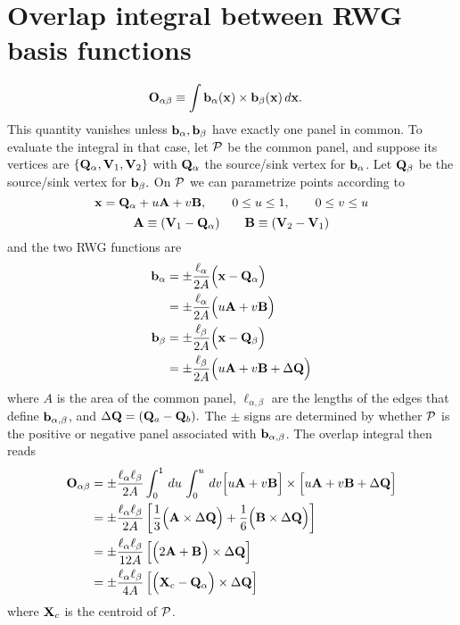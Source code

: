 \newpage
\section{Overlap integral between RWG basis functions}
\label{OverlapIntegralAppendix}

\begin{align*}
\mathbf{O}_{\alpha\beta}
&\equiv
 \int \mathbf{b}_\alpha(\mathbf{x}) \times \mathbf{b}_\beta(\mathbf{x}) \, d\mathbf{x} .
\end{align*}
This quantity vanishes unless $\mathbf{b}_\alpha,\mathbf{b}_\beta$
have exactly one panel in common. To evaluate the integral in
that case, let $\mathcal{P}$ be the common panel, and suppose its vertices
are $\{\mathbf{Q}_\alpha, \mathbf{V}_1, \mathbf{V}_2\}$ with $\mathbf{Q}_\alpha$ the  
source/sink vertex for $\mathbf{b}_\alpha$. Let $\mathbf{Q}_\beta$ be the
source/sink vertex for $\mathbf{b}_\beta.$
On $\mathcal{P}$ we can parametrize points according to 
$$ \mathbf{x} = \mathbf{Q}_\alpha + u\mathbf{A} + v \mathbf{B}, \qquad 0 \le u \le 1, \qquad 0 \le v \le u$$
$$ \mathbf{A} \equiv (\mathbf{V}_1 - \mathbf{Q}_\alpha)
   \qquad 
   \mathbf{B} \equiv (\mathbf{V}_2 - \mathbf{V}_1)
$$
and the two RWG functions are 
\begin{align*}
 \mathbf{b}_\alpha 
 &= \pm \frac{\ell_\alpha}{2A}\Big(\mathbf{x} - \mathbf{Q}_\alpha\Big)
\\
 &= \pm \frac{\ell_\alpha}{2A}\Big(u\mathbf{A} + v\mathbf{B}\Big)
\\
 \mathbf{b}_\beta
 &= \pm \frac{\ell_\beta}{2A}\Big(\mathbf{x} - \mathbf{Q}_\beta\Big)
\\
 &= \pm \frac{\ell_\beta}{2A}\Big(u\mathbf{A} + v\mathbf{B} + \Delta \mathbf{Q}\Big)
\end{align*}
where $A$ is the area of the common panel, $\ell_{\alpha,\beta}$
are the lengths of the edges that define $\mathbf{b}_{\alpha,\beta}$,
and $\Delta \mathbf{Q}=(\mathbf{Q}_a - \mathbf{Q}_b).$ The $\pm$ signs are determined
by whether $\mathcal{P}$ is the positive or negative panel associated
with $\mathbf{b}_{\alpha,\beta}$. The overlap integral then reads
\begin{align*}
\mathbf{O}_{\alpha\beta}
&=\pm \frac{\ell_\alpha \ell_\beta}{2A}
  \int_0^1 \, du \, \int_0^u \, dv
  \Big[ u\mathbf{A} + v\mathbf{B} \Big] \times
  \Big[ u\mathbf{A} + v\mathbf{B} + \Delta \mathbf{Q}\Big]
\\
&=\pm \frac{\ell_\alpha \ell_\beta}{2A}
  \left[ \frac{1}{3}\Big(\mathbf{A} \times \Delta \mathbf{Q}\Big)
       +
        \frac{1}{6}\Big(\mathbf{B} \times \Delta \mathbf{Q}\Big)
  \right]
\\
&=\pm \frac{\ell_\alpha \ell_\beta}{12A}
  \left[ \Big(2\mathbf{A} + \mathbf{B} \Big) \times \Delta \mathbf{Q} \right]
\\
&=\pm \frac{\ell_\alpha \ell_\beta}{4A}
  \left[ \Big( \mathbf{X}_c - \mathbf{Q}_\alpha\Big) \times \Delta \mathbf{Q} \right]
\end{align*}
where $\mathbf{X}_c$ is the centroid of $\mathcal{P}$.
